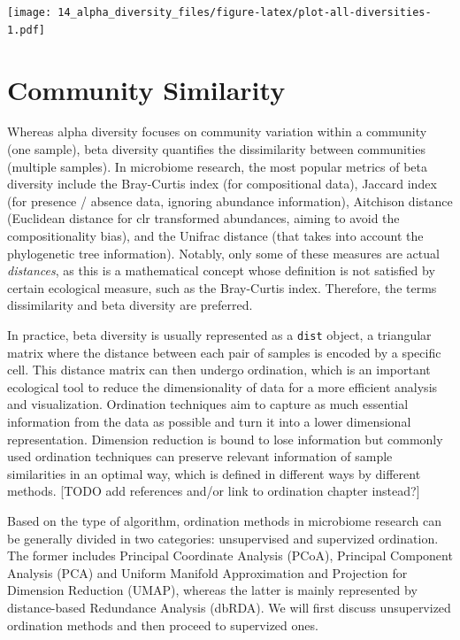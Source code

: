 \documentclass[
]{book}
\begin{document}
\texttt{[image: 14\_alpha\_diversity\_files/figure-latex/plot-all-diversities-1.pdf]}

\hypertarget{community-similarity}{%
\chapter{Community Similarity}\label{community-similarity}}

Whereas alpha diversity focuses on community variation within a community
(one sample), beta diversity quantifies the dissimilarity between communities
(multiple samples). In microbiome research, the most popular metrics of beta
diversity include the Bray-Curtis index (for compositional data), Jaccard index
(for presence / absence data, ignoring abundance information), Aitchison distance
(Euclidean distance for clr transformed abundances, aiming to avoid the
compositionality bias), and the Unifrac distance (that takes into account the
phylogenetic tree information). Notably, only some of these measures are actual
\emph{distances}, as this is a mathematical concept whose definition is not satisfied
by certain ecological measure, such as the Bray-Curtis index. Therefore, the terms
dissimilarity and beta diversity are preferred.

In practice, beta diversity is usually represented as a \texttt{dist} object, a
triangular matrix where the distance between each pair of samples is encoded by
a specific cell. This distance matrix can then undergo ordination, which is an
important ecological tool to reduce the dimensionality of data for a more
efficient analysis and visualization. Ordination techniques aim to capture as
much essential information from the data as possible and turn it into a lower
dimensional representation. Dimension reduction is bound to lose information but
commonly used ordination techniques can preserve relevant information of sample
similarities in an optimal way, which is defined in different ways by different
methods. {[}TODO add references and/or link to ordination chapter instead?{]}

Based on the type of algorithm, ordination methods in microbiome research can
be generally divided in two categories: unsupervised and supervized ordination.
The former includes Principal Coordinate Analysis (PCoA), Principal Component
Analysis (PCA) and Uniform Manifold Approximation and Projection for Dimension
Reduction (UMAP), whereas the latter is mainly represented by distance-based
Redundance Analysis (dbRDA). We will first discuss unsupervized ordination
methods and then proceed to supervized ones.
\end{document}
